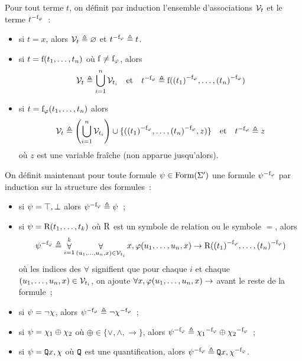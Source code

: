 \begin{definition}\label{def.trad.sans.fun}
  Pour tout terme $t$, on définit par induction l'ensemble d'associations
  $\mathcal V_{t}$ et le terme ${t}^{-\mathrm{f}_{\varphi}}$~:
  \begin{itemize}
  \item si $t = x$, alors $\mathcal V_{t} \triangleq \varnothing$ et
    ${t}^{-\mathrm{f}_{\varphi}} \triangleq t$.
  \item si $t = \mathrm{f}(t_1,\ldots,t_n)$ où $\mathrm{f} \neq \mathrm{f}_{\varphi}$, alors
    \[\mathcal V_{t} \triangleq \bigcup_{i = 1}^n \mathcal V_{t_i} \quad\text{et}\quad
    {t}^{-\mathrm{f}_{\varphi}} \triangleq \mathrm{f}({(t_1)}^{-\mathrm{f}_{\varphi}},\ldots,{(t_n)}^{-\mathrm{f}_{\varphi}})\]
  \item si $t = \mathrm{f}_{\varphi}(t_1,\ldots,t_n)$ alors
    \[\mathcal V_{t} \triangleq \left(\bigcup_{i = 1}^n \mathcal V_{t_i}\right) \cup
    \{({(t_1)}^{-\mathrm{f}_{\varphi}},\ldots,{(t_n)}^{-\mathrm{f}_{\varphi}},z)\} \quad\text{et}\quad
    {t}^{-\mathrm{f}_{\varphi}} \triangleq z\]
    où $z$ est une variable fraîche (non apparue jusqu'alors).
  \end{itemize}

  On définit maintenant pour toute formule $\psi \in \operatorname{Form}(\Sigma')$ une
  formule ${\psi}^{-\mathrm{f}_{\varphi}}$ par induction sur la structure des formules~:
  \begin{itemize}
  \item si $\psi = \top,\bot$ alors ${\psi}^{-\mathrm{f}_{\varphi}} \triangleq \psi$~;
  \item si $\psi = \mathrm{R}(t_1,\ldots,t_k)$ où $\mathrm{R}$ est un symbole de
    relation ou le symbole $=$, alors
    \[{\psi}^{-\mathrm{f}_{\varphi}} \triangleq \mathop{\forall}_{i = 1}^k
    \mathop{\forall}_{(u_1,\ldots,u_n,x)\in \mathcal V_{t_i}} x,
    \varphi(u_1,\ldots,u_n,x) \to \mathrm{R}({(t_1)}^{-\mathrm{f}_{\varphi}},\ldots,{(t_n)}^{-\mathrm{f}_{\varphi}})\]
    où les indices des $\forall$ signifient que pour chaque $i$ et chaque
    $(u_1,\ldots,u_n,x) \in \mathcal V_{t_i}$, on ajoute
    $\forall x, \varphi(u_1,\ldots,u_n,x) \to$ avant le reste de la formule~;
  \item si $\psi = \lnot \chi$, alors ${\psi}^{-\mathrm{f}_{\varphi}}\triangleq\lnot{\chi}^{-\mathrm{f}_{\varphi}}$~;
  \item si $\psi = \chi_1 \oplus \chi_2$ où
    $\oplus \in \{\lor,\land,\to\}$, alors
    ${\psi}^{-\mathrm{f}_{\varphi}} \triangleq {\chi_1}^{-\mathrm{f}_{\varphi}} \oplus {\chi_2}^{-\mathrm{f}_{\varphi}}$~;
  \item si $\psi = {\normalfont\texttt{Q}} x, \chi$ où ${\normalfont\texttt{Q}}$ est une quantification,
    alors ${\psi}^{-\mathrm{f}_{\varphi}} \triangleq {\normalfont\texttt{Q}} x,{\chi}^{-\mathrm{f}_{\varphi}}$.
  \end{itemize}
\end{definition}

